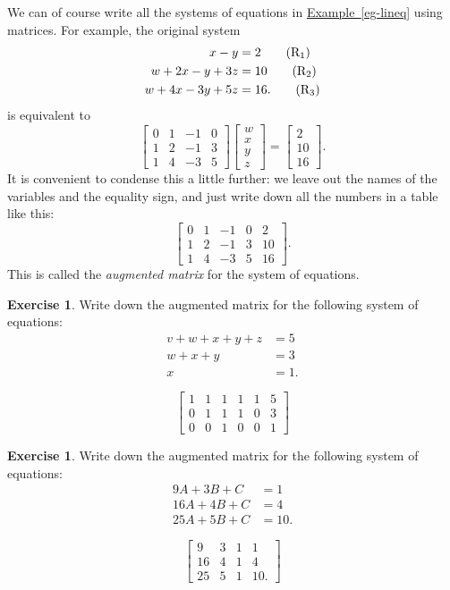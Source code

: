 \documentclass[a4paper]{book}
\newcommand{\PURPLE}[1]{{\color{purple}#1}}
\newcommand{\bbm}       {\begin{bmatrix}}
\newcommand{\ebm}       {\end{bmatrix}}
\renewcommand{\:}{\colon}
\newcommand{\biref}[2]{\hyperlink{#2}{#1~\ref*{#2}}}
\newcommand{\DEFN}[1]{\PURPLE{\emph{#1}}}
\theoremstyle{definition}
\newtheorem{exercise}[theorem]{Exercise}
\renewenvironment{solution}{\SolutionInline}{\endSolutionInline}
\begin{document}
We can of course write all the systems of equations in
\biref{Example}{eg-lineq} using matrices.  For example, the original
system
\begin{align*}
 x-y       &= 2   \tag{R${}_1$}\\
 w+2x-y+3z &= 10  \tag{R${}_2$}\\
 w+4x-3y+5z&= 16. \tag{R${}_3$}
\end{align*}
is equivalent to 
\[ \bbm
    0 & 1 & -1 & 0 \\
    1 & 2 & -1 & 3 \\
    1 & 4 & -3 & 5
   \ebm 
   \bbm w \\ x \\ y \\ z \ebm = 
   \bbm 2 \\ 10 \\ 16 \ebm.
\]
It is convenient to condense this a little further: we leave out the
names of the variables and the equality sign, and just write down all
the numbers in a table like this:
\[ \left[\begin{array}{cccc|c}
    0 & 1 & -1 & 0 & 2  \\
    1 & 2 & -1 & 3 & 10 \\
    1 & 4 & -3 & 5 & 16
   \end{array}\right].
\]
This is called the \DEFN{augmented matrix} for the system of
equations.  
\begin{exercise}
 Write down the augmented matrix for the following system of
 equations:
 \begin{align*}
  v+w+x+y+z &= 5 \\
    w+x+y   &= 3 \\
      x     &= 1. 
 \end{align*}
\end{exercise}
\begin{solution}
 \[ \left[\begin{array}{ccccc|c}
     1 & 1 & 1 & 1 & 1 & 5 \\
     0 & 1 & 1 & 1 & 0 & 3 \\
     0 & 0 & 1 & 0 & 0 & 1
    \end{array}\right]
 \]
\end{solution}
\begin{exercise}
 Write down the augmented matrix for the following system of
 equations:
 \begin{align*}
  9A + 3B + C &= 1 \\
  16A + 4B + C &= 4 \\
  25A + 5B + C &= 10.   
 \end{align*}
\end{exercise}
\begin{solution}
 \[ \left[\begin{array}{ccc|c}
     9  & 3 & 1 & 1 \\
     16 & 4 & 1 & 4 \\
     25 & 5 & 1 & 10.
    \end{array}\right]
 \]
\end{solution}
\end{document}
